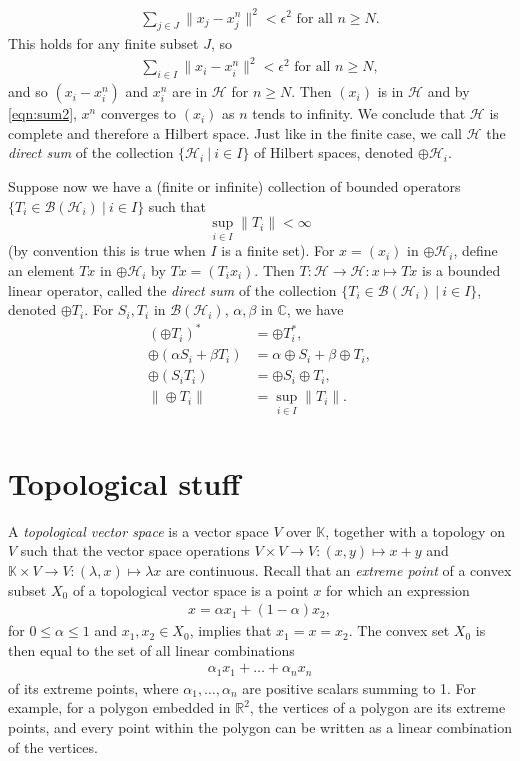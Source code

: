 \documentclass[12pt,a4paper]{report}
\theoremstyle{plain}
\theoremstyle{definition}
\newcommand{\1}{\mathbbm{1}}
\newcommand{\C}{\mathbb{C}}
\newcommand{\R}{\mathbb{R}}
\renewcommand{\H}{\mathcal{H}}
\newcommand{\B}{\mathcal{B}}
\begin{document}
\begin{align}\label{eqn:sum2}
	\sum_{j\in J}{\|x_j-x^n_j\|^2} < \epsilon^2  \mbox{ for all } n\geq N.
\end{align}
This holds for any finite subset $J$, so
\begin{align*}
	\sum_{i\in I}{\|x_i-x^n_i\|^2} < \epsilon^2  \mbox{ for all } n\geq N,
\end{align*}
and so $(x_i-x^n_i)$ and $x^n_i$ are in $\H$ for $n\geq N$. 
Then $(x_i)$ is in $\H$ and by \eqref{eqn:sum2}, $x^n$ converges to $(x_i)$ as $n$ tends 
to infinity. We conclude that $\H$ is complete and therefore a Hilbert space. Just like in the finite 
case, we call $\H$ the \emph{direct sum} of the collection $\{\H_i ~|~ i\in I\}$ of Hilbert spaces, 
denoted $\oplus\H_i$.

Suppose now we have a (finite or infinite) collection of bounded operators 
$\{T_i\in\B{(\H_i)} ~|~ i\in I\}$ such that 
\[
	\sup_{i\in I} {\|T_i\|} < \infty
\] 
(by convention this is true when $I$ is a finite set).
For $x=(x_i)$ in $\oplus\H_i$, define an element $Tx$ in $\oplus\H_i$ by $Tx=(T_ix_i)$. 
Then $T:\H\to\H:x\mapsto Tx$ is a bounded linear operator, called the \emph{direct sum} of the 
collection $\{T_i\in\B{(\H_i)} ~|~ i \in I\}$, denoted $\oplus T_i$. For $S_i,T_i$ in 
$\B(\H_i)$, $\alpha,\beta$ in $\C$, we have 
\begin{align*}
		\left(\oplus T_i\right)^\ast &= \oplus T_i^\ast,		\\
		\oplus (\alpha S_i+\beta T_i) &= 
					\alpha \oplus S_i + \beta \oplus T_i, 		\\
		\oplus (S_i T_i) &= \oplus S_i \oplus T_i,				\\
		\|\oplus T_i\| &= \sup_{i\in I} {\|T_i\|}.				\\
\end{align*}

\section{Topological stuff}

A \emph{topological vector space} is a vector space $V$ over $\mathbb K$, together with a topology on 
$V$ such that the vector space operations $V\times V\to V:(x,y)\mapsto x+y$ and $\mathbb{K}\times V\to 
V:(\lambda,x)\mapsto \lambda x$ are continuous. 
Recall that an \emph{extreme point} of a convex subset $X_0$ of a topological vector space is a point 
$x$ for which an expression
\begin{align*}
	x = \alpha x_1 +(1-\alpha)x_2,
\end{align*}
for $0\leq\alpha\leq1$ and $x_1,x_2\in X_0$, implies that $x_1=x=x_2$. 
The convex set $X_0$ is then equal to the set of all linear combinations
\begin{align*}
	\alpha_1 x_1+\dots +\alpha_n x_n
\end{align*}
of its extreme points, where $\alpha_1,\dots,\alpha_n$ are positive scalars summing to 1.
For example, for a polygon embedded in $\R^2$, the vertices of a polygon are its extreme points, and
every point within the polygon can be written as a linear combination of the vertices.
\end{document}
